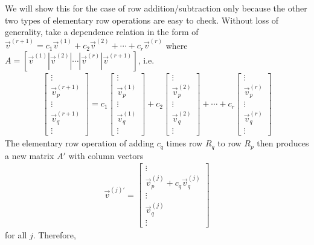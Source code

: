 We will show this for the case of row addition/subtraction only because the other two types of elementary row operations are easy to check. Without loss of generality, take a dependence relation in the form of $\vec{v}^{(r+1)} = c_1\vec{v}^{(1)} + c_2\vec{v}^{(2)} + \cdots + c_r\vec{v}^{(r)}$ where $A=[\vec{v}^{(1)}|\vec{v}^{(2)}|\cdots|\vec{v}^{(r)}|\vec{v}^{(r+1)}]$, i.e. \begin{align*}
\begin{bmatrix}
\vdots \\
\vec{v}_p^{(r+1)} \\
\vdots \\
\vec{v}_q^{(r+1)} \\
\vdots
\end{bmatrix}
= c_1
\begin{bmatrix}
\vdots \\
\vec{v}_p^{(1)} \\
\vdots \\
\vec{v}_q^{(1)} \\
\vdots
\end{bmatrix}
+ c_2
\begin{bmatrix}
\vdots \\
\vec{v}_p^{(2)} \\
\vdots \\
\vec{v}_q^{(2)} \\
\vdots
\end{bmatrix} + \cdots + 
c_r
\begin{bmatrix}
\vdots \\
\vec{v}_p^{(r)} \\
\vdots \\
\vec{v}_q^{(r)} \\
\vdots
\end{bmatrix}
\end{align*}
The elementary row operation of adding $c_q$ times row $R_q$ to row $R_p$ then produces a new matrix $A'$ with column vectors
\begin{align*}
\vec{v}^{(j)'}
=
\begin{bmatrix}
\vdots \\
\vec{v}_p^{(j)} + c_q\vec{v}_q^{(j)} \\
\vdots \\
\vec{v}_q^{(j)} \\
\vdots
\end{bmatrix}
\end{align*}
for all $j$. Therefore,

